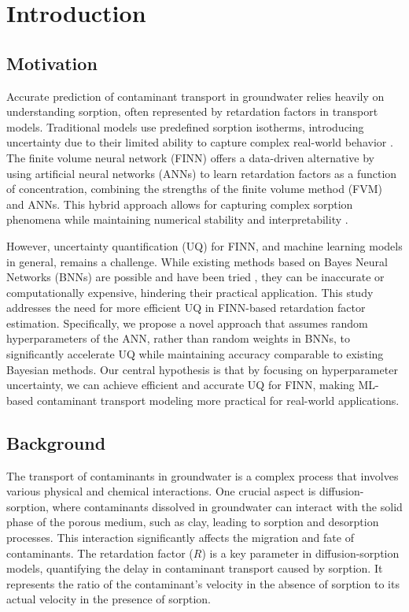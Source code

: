 \section{Introduction}

\subsection{Motivation}
Accurate prediction of contaminant transport in groundwater relies heavily on understanding sorption, often represented by retardation factors in transport models. Traditional models use predefined sorption isotherms, introducing uncertainty due to their limited ability to capture complex real-world behavior \cite{finn}. The finite volume neural network (FINN) \cite{finn} offers a data-driven alternative by using artificial neural networks (ANNs) to learn retardation factors as a function of concentration, combining the strengths of the finite volume method (FVM) and ANNs. This hybrid approach allows for capturing complex sorption phenomena while maintaining numerical stability and interpretability \cite{finn}.

However, uncertainty quantification (UQ) for FINN, and machine learning models in general, remains a challenge. While existing methods based on Bayes Neural Networks (BNNs) are possible and have been tried \cite{finn}, they can be inaccurate or computationally expensive, hindering their practical application. This study addresses the need for more efficient UQ in FINN-based retardation factor estimation. Specifically, we propose a novel approach that assumes random hyperparameters of the ANN, rather than random weights in BNNs, to significantly accelerate UQ while maintaining accuracy comparable to existing Bayesian methods. Our central hypothesis is that by focusing on hyperparameter uncertainty, we can achieve efficient and accurate UQ for FINN, making ML-based contaminant transport modeling more practical for real-world applications.


\subsection{Background}
The transport of contaminants in groundwater is a complex process that involves various physical and chemical interactions. One crucial aspect is diffusion-sorption, where contaminants dissolved in groundwater can interact with the solid phase of the porous medium, such as clay, leading to sorption and desorption processes. This interaction significantly affects the migration and fate of contaminants.
The retardation factor ($R$) is a key parameter in diffusion-sorption models, quantifying the delay in contaminant transport caused by sorption. It represents the ratio of the contaminant's velocity in the absence of sorption to its actual velocity in the presence of sorption.

